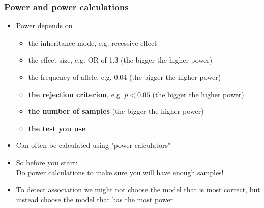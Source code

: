 \documentclass[xcolor=pdftex,dvipsnames,table,10pt]{beamer}
\begin{document}
\begin{frame}
\vspace{-.8cm}
  \frametitle{Power and power calculations}
  \small
  \begin{itemize}
 \item<1-> Power depends on
 \begin{itemize}
  \item the inheritance mode, e.g. recessive effect
   \item the effect size, e.g. OR of 1.3 (the bigger the higher power)
    \item the frequency of allele, e.g. 0.04 (the bigger the higher power)
  \item \textbf{the rejection criterion}, e.g. $p<0.05$ (the bigger the higher power)
  \item \textbf{the number of samples} (the bigger the higher power) 
 \item \textbf{the test you use} 
   \end{itemize}
\item<2-> Can often be calculated using "power-calculators"
 \item<3-> So before you start: \\Do power calculations to make sure you will have enough samples!
 \item<4-> To detect association we might not choose the model that is most correct, but instead choose the model that has the most power
    \end{itemize}
\end{frame}
\end{document}
